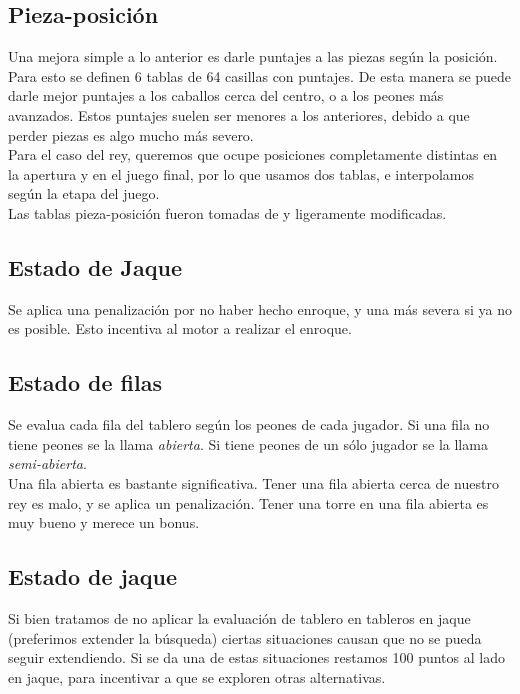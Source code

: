 \documentclass{article}
\begin{document}
\begin{multicols}{2}
\subsection{Pieza-posición}
Una mejora simple a lo anterior es darle puntajes a las piezas según la
posición. Para esto se definen 6 tablas de 64 casillas con puntajes.
De esta manera se puede darle mejor puntajes a los caballos cerca del
centro, o a los peones más avanzados. Estos puntajes suelen ser menores
a los anteriores, debido a que perder piezas es algo mucho más severo.
\\

Para el caso del rey, queremos que ocupe posiciones completamente
distintas en la apertura y en el juego final, por lo que usamos dos
tablas, e interpolamos según la etapa del juego.
\\

Las tablas pieza-posición fueron tomadas de \cite{piece-square-table} y
ligeramente modificadas.

\subsection{Estado de Jaque}
Se aplica una penalización por no haber hecho enroque, y una más severa
si ya no es posible. Esto incentiva al motor a realizar el enroque.

\subsection{Estado de filas}
Se evalua cada fila del tablero según los peones de cada jugador. Si
una fila no tiene peones se la llama \emph{abierta}. Si tiene peones de
un sólo jugador se la llama \emph{semi-abierta}.
\\

Una fila abierta es bastante significativa. Tener una fila abierta cerca
de nuestro rey es malo, y se aplica un penalización. Tener una torre en
una fila abierta es muy bueno y merece un bonus.

\subsection{Estado de jaque}
Si bien tratamos de no aplicar la evaluación de tablero en tableros
en jaque (preferimos extender la búsqueda) ciertas situaciones causan
que no se pueda seguir extendiendo. Si se da una de estas situaciones
restamos 100 puntos al lado en jaque, para incentivar a que se exploren
otras alternativas.


\end{multicols}
\end{document}
